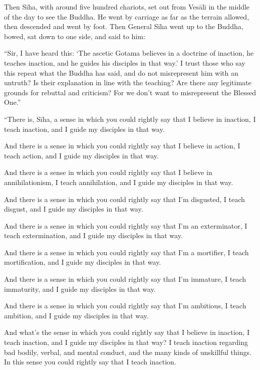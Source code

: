 \documentclass[12pt,openany]{book}%
\begin{document}
Then \textsanskrit{Sīha}, with around five hundred chariots, set out from \textsanskrit{Vesālī} in the middle of the day to see the Buddha. He went by carriage as far as the terrain allowed, then descended and went by foot. Then General \textsanskrit{Sīha} went up to the Buddha, bowed, sat down to one side, and said to him: 

“Sir, I have heard this: ‘The ascetic Gotama believes in a doctrine of inaction, he teaches inaction, and he guides his disciples in that way.’ I trust those who say this repeat what the Buddha has said, and do not misrepresent him with an untruth? Is their explanation in line with the teaching? Are there any legitimate grounds for rebuttal and criticism? For we don’t want to misrepresent the Blessed One.” 

“There is, \textsanskrit{Sīha}, a sense in which you could rightly say that I believe in inaction, I teach inaction, and I guide my disciples in that way. 

And there is a sense in which you could rightly say that I believe in action, I teach action, and I guide my disciples in that way. 

And there is a sense in which you could rightly say that I believe in annihilationism, I teach annihilation, and I guide my disciples in that way. 

And there is a sense in which you could rightly say that I’m disgusted, I teach disgust, and I guide my disciples in that way. 

And there is a sense in which you could rightly say that I'm an exterminator, I teach extermination, and I guide my disciples in that way. 

And there is a sense in which you could rightly say that I’m a mortifier, I teach mortification, and I guide my disciples in that way. 

And there is a sense in which you could rightly say that I’m immature, I teach immaturity, and I guide my disciples in that way. 

And there is a sense in which you could rightly say that I’m ambitious, I teach ambition, and I guide my disciples in that way. 

And what’s the sense in which you could rightly say that I believe in inaction, I teach inaction, and I guide my disciples in that way? I teach inaction regarding bad bodily, verbal, and mental conduct, and the many kinds of unskillful things. In this sense you could rightly say that I teach inaction. 
\end{document}
